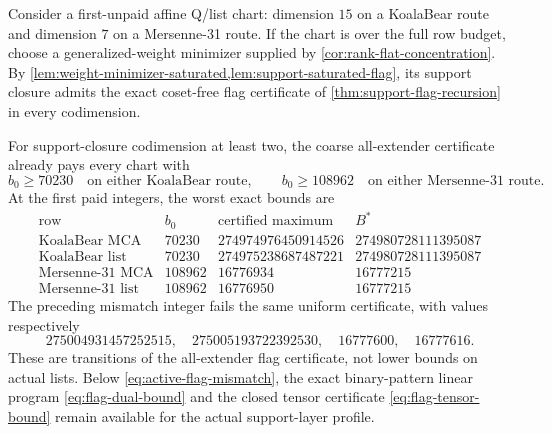 \documentclass[11pt,a4paper]{amsart}
\numberwithin{equation}{section}
\theoremstyle{remark}
\begin{document}
\begin{proposition}
\label{prop:active-support-flag}
Consider a first-unpaid affine Q/list chart: dimension $15$ on a
KoalaBear route and dimension $7$ on a Mersenne-31 route.  If the chart is
over the full row budget, choose a generalized-weight minimizer supplied
by \cref{cor:rank-flat-concentration}.  By
\cref{lem:weight-minimizer-saturated,lem:support-saturated-flag}, its
support closure admits the exact coset-free flag certificate of
\cref{thm:support-flag-recursion} in every codimension.

For support-closure codimension at least two, the coarse all-extender
certificate already pays every chart with
\begin{equation}
 b_0\ge70230
 \quad\text{on either KoalaBear route},
 \qquad
 b_0\ge108962
 \quad\text{on either Mersenne-31 route}.
 \label{eq:active-flag-mismatch}
\end{equation}
At the first paid integers, the worst exact bounds are
\[
\begin{array}{c|r|r|r}
\text{row}&b_0&\text{certified maximum}&B^*\\ \hline
\text{KoalaBear MCA}&70230&274974976450914526&274980728111395087\\
\text{KoalaBear list}&70230&274975238687487221&274980728111395087\\
\text{Mersenne-31 MCA}&108962&16776934&16777215\\
\text{Mersenne-31 list}&108962&16776950&16777215
\end{array}
\tag{HF-active}\label{eq:active-flag-budgets}
\]
The preceding mismatch integer fails the same uniform certificate, with
values respectively
\[
 275004931457252515,
 \quad275005193722392530,
 \quad16777600,
 \quad16777616.
\]
These are transitions of the all-extender flag certificate, not lower
bounds on actual lists.  Below \eqref{eq:active-flag-mismatch}, the exact
binary-pattern linear program \eqref{eq:flag-dual-bound} and the closed
tensor certificate \eqref{eq:flag-tensor-bound} remain available for the
actual support-layer profile.
\end{proposition}
\end{document}

